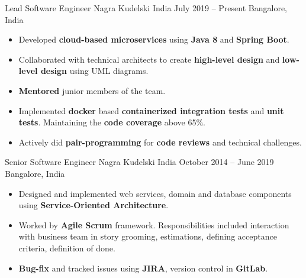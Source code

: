 \documentclass[9.5pt,a4paper]{altacv}
\begin{document}


\cvexp
{Lead Software Engineer}
{Nagra Kudelski India}
{July 2019 -- Present}
{Bangalore, India}



\begin{itemize}

    
    \item 
    Developed \textbf{cloud-based microservices} using \textbf{Java 8} and \textbf{Spring Boot}.
    
    \item 
    Collaborated with technical architects to create \textbf{high-level design} and \textbf{low-level design} using UML diagrams.
    
    \item 
    \textbf{Mentored} junior members of the team.
    
    \item
    Implemented \textbf{docker} based \textbf{containerized integration tests} and \textbf{unit tests}. Maintaining the \textbf{code coverage} above 65\%.
    
    \item
    Actively did \textbf{pair-programming} for \textbf{code reviews} and technical challenges.
    
\end{itemize}

\divider



\cvexp
{Senior Software Engineer}
{Nagra Kudelski India}
{October 2014 -- June 2019}
{Bangalore, India}

\begin{itemize}

    \item 
    Designed and implemented web services, domain and database components using \textbf{Service-Oriented Architecture}.
    
    \item 
    Worked by \textbf{Agile Scrum} framework. Responsibilities included interaction with business team in story grooming, estimations, defining acceptance criteria, definition of done.  
    
    \item 
    \textbf{Bug-fix} and tracked issues using \textbf{JIRA}, version control in \textbf{GitLab}.
    
\end{itemize}
\end{document}
